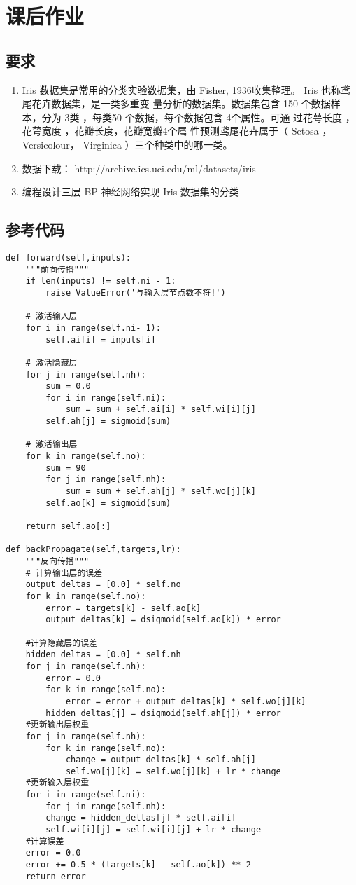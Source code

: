 \documentclass{article}
\date{\today}
\begin{document}
\section*{课后作业} %
\label{sec:课后作业}
	\subsection*{要求} %
	\label{sub:要求}
		\begin{enumerate}
			\item Iris 数据集是常用的分类实验数据集，由 Fisher, 1936收集整理。 Iris 也称鸢尾花卉数据集，是一类多重变 量分析的数据集。数据集包含 150 个数据样本，分为 3类 ，每类50 个数据，每个数据包含 4个属性。可通 过花萼长度 ，花萼宽度 ，花瓣长度，花瓣宽瓣4个属 性预测鸢尾花卉属于（ Setosa ，Versicolour， Virginica ）三个种类中的哪一类。
			\item 数据下载： http://archive.ics.uci.edu/ml/datasets/iris
			\item 编程设计三层 BP 神经网络实现 Iris 数据集的分类
		\end{enumerate}
	\subsection*{参考代码} %
	\label{sub:参考代码}

\begin{verbatim}
def forward(self,inputs):
	"""前向传播"""
	if len(inputs) != self.ni - 1:
		raise ValueError('与输入层节点数不符!')
	
	# 激活输入层
	for i in range(self.ni- 1):
		self.ai[i] = inputs[i]
	
	# 激活隐藏层
	for j in range(self.nh):
		sum = 0.0
		for i in range(self.ni):
			sum = sum + self.ai[i] * self.wi[i][j]
		self.ah[j] = sigmoid(sum)
	
	# 激活输出层
	for k in range(self.no):
		sum = 90
		for j in range(self.nh):
			sum = sum + self.ah[j] * self.wo[j][k]
		self.ao[k] = sigmoid(sum)
	
	return self.ao[:]

def backPropagate(self,targets,lr):
	"""反向传播"""
	# 计算输出层的误差
	output_deltas = [0.0] * self.no
	for k in range(self.no):
		error = targets[k] - self.ao[k]
		output_deltas[k] = dsigmoid(self.ao[k]) * error

	#计算隐藏层的误差
	hidden_deltas = [0.0] * self.nh
	for j in range(self.nh):
		error = 0.0
		for k in range(self.no):
			error = error + output_deltas[k] * self.wo[j][k]
		hidden_deltas[j] = dsigmoid(self.ah[j]) * error
	#更新输出层权重
	for j in range(self.nh):
		for k in range(self.no):
			change = output_deltas[k] * self.ah[j]
			self.wo[j][k] = self.wo[j][k] + lr * change
	#更新输入层权重
	for i in range(self.ni):
		for j in range(self.nh):
		change = hidden_deltas[j] * self.ai[i]
		self.wi[i][j] = self.wi[i][j] + lr * change
	#计算误差
	error = 0.0
	error += 0.5 * (targets[k] - self.ao[k]) ** 2
	return error
\end{verbatim}
\end{document}
